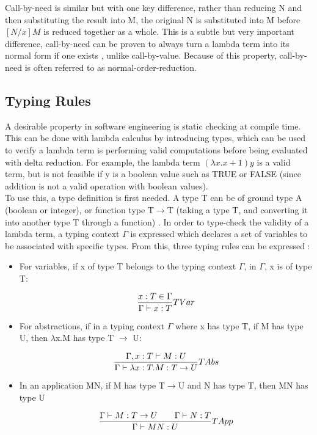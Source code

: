 \documentclass[a4paper,11pt]{report}
\begin{document}
Call-by-need is similar but with one key difference, rather than reducing N and then substituting the result into M, the original N is substituted into M before $[N / x]M$ is reduced together as a whole. This is a subtle but very important difference, call-by-need can be proven to always turn a lambda term into its normal form if one exists \cite{Horowitz2013}, unlike call-by-value. Because of this property, call-by-need is often referred to as normal-order-reduction.

\subsection{Typing Rules}

A desirable property in software engineering is static checking at compile time. This can be done with lambda calculus by introducing types, which can be used to verify a lambda term is performing valid computations before being evaluated with delta reduction. For example, the lambda term $(\lambda x.x+1)y$ is a valid term, but is not feasible if y is a boolean value such as TRUE or FALSE (since addition is not a valid operation with boolean values).\\

To use this, a type definition is first needed. A type T can be of ground type A (boolean or integer), or function type T$\rightarrow$T (taking a type T, and converting it into another type T through a function) \cite{Gay2019}. In order to type-check the validity of a lambda term, a typing context $\Gamma$ is expressed which declares a set of variables to be associated with specific types. From this, three typing rules can be expressed \cite{Gay2019}:

\begin{itemize}
	\item For variables, if x of type T belongs to the typing context $\Gamma$, in $\Gamma$, x is of type T:
	
	\begin{equation}
	\centering
	\frac{x:T\in \Gamma}{\Gamma \vdash x:T}TVar
	\label{variable_type}
	\end{equation}
	\item For abstractions, if in a typing context $\Gamma$ where x has type T, if M has type U, then $\lambda$x.M has type T $\rightarrow$ U:
	
	\begin{equation}
	\centering
	\frac{\Gamma ,x:T\vdash M:U}{\Gamma \vdash \lambda x:T.M:T \to U}TAbs
	\end{equation}
	\item  In an application MN, if M has type T$\rightarrow$U and N has type T, then MN has type U
	
	\begin{equation}
	\centering
	\frac{\Gamma \vdash M:T \to U \qquad \Gamma \vdash N:T}{\Gamma \vdash MN:U}TApp
	\label{application_types}
	\end{equation}
\end{itemize}
\end{document}
